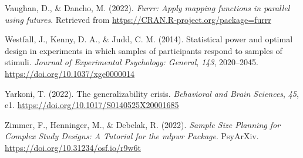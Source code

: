 \documentclass[
  man,floatsintext]{apa6}
\newlength{\cslhangindent}
\newlength{\cslentryspacingunit} %
\newenvironment{CSLReferences}[2] %
 {%
  \setlength{\parindent}{0pt}
  \ifodd #1
  \let\oldpar\par
  \def\par{\hangindent=\cslhangindent\oldpar}
  \fi
  \setlength{\parskip}{#2\cslentryspacingunit}
 }%
 {}
\begin{document}
\begin{CSLReferences}{1}{0}
\leavevmode{}%
Vaughan, D., \& Dancho, M. (2022). \emph{Furrr: Apply mapping functions in parallel using futures}. Retrieved from \url{https://CRAN.R-project.org/package=furrr}

\leavevmode{}%
Westfall, J., Kenny, D. A., \& Judd, C. M. (2014). Statistical power and optimal design in experiments in which samples of participants respond to samples of stimuli. \emph{Journal of Experimental Psychology: General}, \emph{143}, 2020--2045. \url{https://doi.org/10.1037/xge0000014}

\leavevmode{}%
Yarkoni, T. (2022). The generalizability crisis. \emph{Behavioral and Brain Sciences}, \emph{45}, e1. \url{https://doi.org/10.1017/S0140525X20001685}

\leavevmode{}%
Zimmer, F., Henninger, M., \& Debelak, R. (2022). \emph{Sample {Size Planning} for {Complex Study Designs}: {A Tutorial} for the mlpwr {Package}}. {PsyArXiv}. \url{https://doi.org/10.31234/osf.io/r9w6t}

\end{CSLReferences}
\end{document}
